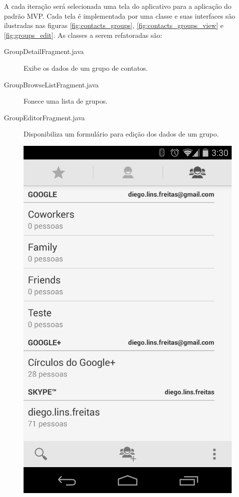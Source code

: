 A cada iteração será selecionada uma tela do aplicativo para a aplicação do
padrão MVP. Cada tela é implementada por uma classe e suas interfaces
são ilustradas nas figuras \ref{fig:contacts_groups},
\ref{fig:contacts_groups_view} e \ref{fig:groups_edit}. As classes a serem refatoradas são:
\begin{description}
\item[GroupDetailFragment.java] Exibe os dados de um grupo de contatos.
\item[GroupBrowseListFragment.java] Fonece uma lista de grupos.
\item[GroupEditorFragment.java] Disponibiliza um formulário para edição dos
dados de um grupo.
\end{description}

\begin{figure}[!h]
\begin{minipage}{.5\textwidth}
	\centering
	\includegraphics[scale=0.25]{img/contacts_groups.png}

\end{minipage}
\end{figure}
